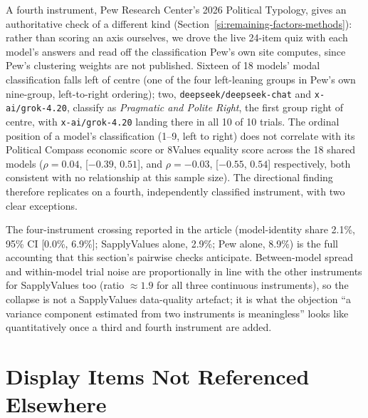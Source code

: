 \documentclass[11pt]{article}
\begin{document}
A fourth instrument, Pew Research Center's 2026 Political Typology, gives
an authoritative check of a different kind (Section~\ref{si:remaining-factors-methods}):
rather than scoring an axis ourselves, we drove the live 24-item quiz with
each model's answers and read off the classification Pew's own site
computes, since Pew's clustering weights are not published. Sixteen of 18
models' modal classification falls left of centre (one of the four
left-leaning groups in Pew's own nine-group, left-to-right ordering);
two, \texttt{deepseek/deepseek-chat} and \texttt{x-ai/grok-4.20}, classify
as \emph{Pragmatic and Polite Right}, the first group right of centre, with
\texttt{x-ai/grok-4.20} landing there in all 10 of 10 trials. The ordinal
position of a model's classification (1--9, left to right) does not
correlate with its Political Compass economic score or 8Values equality
score across the 18 shared models ($\rho=0.04$, [$-0.39$, $0.51$], and
$\rho=-0.03$, [$-0.55$, $0.54$] respectively, both consistent with no
relationship at this sample size). The directional finding therefore
replicates on a fourth, independently classified instrument, with two clear
exceptions.

The four-instrument crossing reported in the article (model-identity share 2.1\%, 95\% CI [0.0\%, 6.9\%]; SapplyValues alone, 2.9\%; Pew alone, 8.9\%) is the full
accounting that this section's pairwise checks anticipate. Between-model
spread and within-model trial noise are proportionally in line with the
other instruments for SapplyValues too (ratio $\approx 1.9$ for all three
continuous instruments), so the collapse is not a SapplyValues
data-quality artefact; it is what the objection ``a variance component
estimated from two instruments is meaningless'' looks like quantitatively
once a third and fourth instrument are added.

\section{Display Items Not Referenced Elsewhere}
\end{document}
